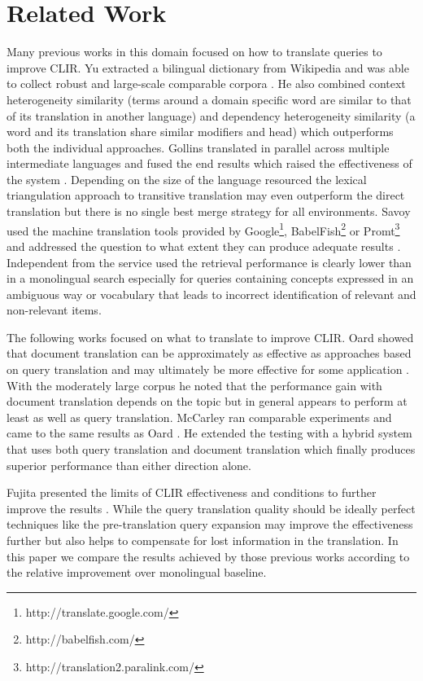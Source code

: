 \documentclass[journal]{IEEEtran}
\begin{document}
\section{Related Work}
Many previous works in this domain focused on how to translate queries to improve CLIR.
Yu extracted a bilingual dictionary from Wikipedia and was able to collect robust and large-scale comparable corpora \cite{yu09}.
He also combined context heterogeneity similarity (terms around a domain specific word are similar to that of its translation in another language) and dependency heterogeneity similarity (a word and its translation share similar modifiers and head) which outperforms both the individual approaches.
Gollins translated in parallel across multiple intermediate languages and fused the end results which raised the effectiveness of the system \cite{gollins01}.
Depending on the size of the language resourced the lexical triangulation approach to transitive translation may even outperform the direct translation but there is no single best merge strategy for all environments.
Savoy used the machine translation tools provided by Google\footnote{http://translate.google.com/}, BabelFish\footnote{http://babelfish.com/} or Promt\footnote{http://translation2.paralink.com/} and addressed the question to what extent they can produce adequate results \cite{savoy09}.
Independent from the service used the retrieval performance is clearly lower than in a monolingual search especially for queries containing concepts expressed in an ambiguous way or vocabulary that leads to incorrect identification of relevant and non-relevant items.

The following works focused on what to translate to improve CLIR.
Oard showed that document translation can be approximately as effective as approaches based on query translation and may ultimately be more effective for some application \cite{oard97b}.
With the moderately large corpus he noted that the performance gain with document translation depends on the topic but in general appears to perform at least as well as query translation.
McCarley ran comparable experiments and came to the same results as Oard \cite{mccarley99}.
He extended the testing with a hybrid system that uses both query translation and document translation which finally produces superior performance than either direction alone.

Fujita presented the limits of CLIR effectiveness and conditions to further improve the results \cite{fujita01}.
While the query translation quality should be ideally perfect techniques like the pre-translation query expansion may improve the effectiveness further but also helps to compensate for lost information in the translation.
In this paper we compare the results achieved by those previous works according to the relative improvement over monolingual baseline.
\end{document}
